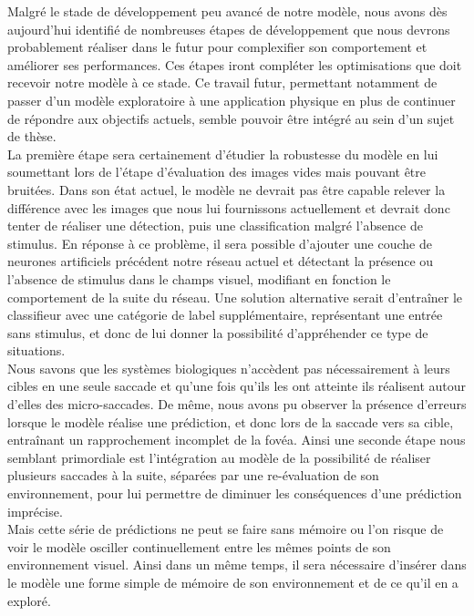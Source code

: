 
Malgré le stade de développement peu avancé de notre modèle, nous avons dès aujourd'hui identifié de nombreuses étapes de développement que nous devrons probablement réaliser dans le futur pour complexifier son comportement et améliorer ses performances. 
Ces étapes iront compléter les optimisations que doit recevoir notre modèle à ce stade.
Ce travail futur, permettant notamment de passer d'un modèle exploratoire à une application physique en plus de continuer de répondre aux objectifs actuels, semble pouvoir être intégré au sein d'un sujet de thèse.\\
La première étape sera certainement d'étudier la robustesse du modèle en lui soumettant lors de l'étape d'évaluation des images vides mais pouvant être bruitées.
Dans son état actuel, le modèle ne devrait pas être capable relever la différence avec les images que nous lui fournissons actuellement et devrait donc tenter de réaliser une détection, puis une classification malgré l'absence de stimulus.
En réponse à ce problème, il sera possible d'ajouter une couche de neurones artificiels précédent notre réseau actuel et détectant la présence ou l'absence de stimulus dans le champs visuel, modifiant en fonction le comportement de la suite du réseau. 
Une solution alternative serait d'entraîner le classifieur avec une catégorie de label supplémentaire, représentant une entrée sans stimulus, et donc de lui donner la possibilité d'appréhender ce type de situations. \\
Nous savons que les systèmes biologiques n'accèdent pas nécessairement à leurs cibles en une seule saccade et qu'une fois qu'ils les ont atteinte ils réalisent autour d'elles des micro-saccades.
De même, nous avons pu observer la présence d'erreurs lorsque le modèle réalise une prédiction, et donc lors de la saccade vers sa cible, entraînant un rapprochement incomplet de la fovéa.
Ainsi une seconde étape nous semblant primordiale est l'intégration au modèle de la possibilité de réaliser plusieurs saccades à la suite, séparées par une re-évaluation de son environnement, pour lui permettre de diminuer les conséquences d'une prédiction imprécise. \autocite{Najemnik2005, Werner2014}\\
Mais cette série de prédictions ne peut se faire sans mémoire ou l'on risque de voir le modèle osciller continuellement entre les mêmes points de son environnement visuel.
Ainsi dans un même temps, il sera nécessaire d'insérer dans le modèle une forme simple de mémoire de son environnement et de ce qu'il en a exploré.
